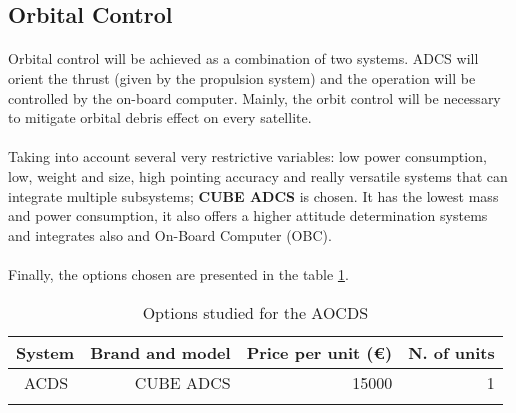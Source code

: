 \subsection{Orbital Control}
\paragraph{}Orbital control will be achieved as a combination of two systems. ADCS will orient the thrust (given by the propulsion system) and the operation will be controlled by the on-board computer. Mainly, the orbit control will be necessary to mitigate orbital debris effect on every satellite.

\paragraph{} Taking into account several very restrictive variables: low power consumption, low, weight and size, high pointing accuracy and really versatile systems that can integrate multiple subsystems; \textbf{CUBE ADCS} is chosen. It has the lowest mass and power consumption, it also offers a higher attitude determination systems and integrates also and On-Board Computer (OBC).

\paragraph{}Finally, the options chosen are presented in the table \ref{epsfinal}.

\begin{longtable}{| l | r | r | r | }
\hline
\rowcolor[gray]{0.80}	\textbf{System} &  \textbf{Brand and model}     & \textbf{Price per unit (\euro)}  & \textbf{N. of units}  \\
\hline
\endfirsthead

	   ~ACDS & CUBE ADCS & 15000 & 1\\
	\hline

\caption{Options studied for the AOCDS}
\label{epsfinal}
\end{longtable}


